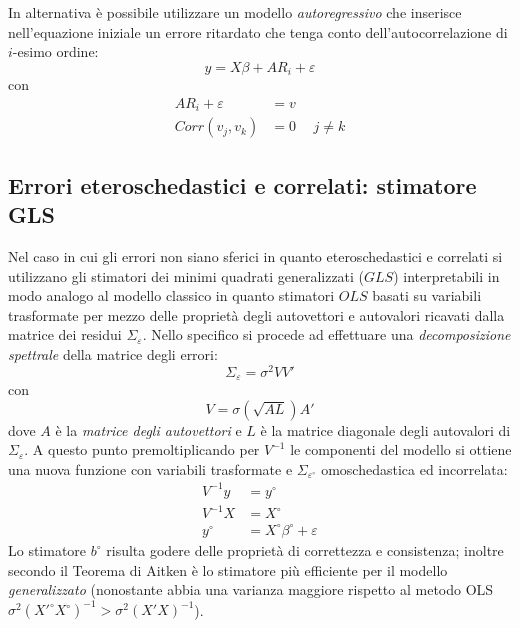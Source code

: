 \documentclass[a4page, 11pt]{article} %
\begin{document}
In alternativa è possibile utilizzare un modello \textit{autoregressivo} che inserisce nell’equazione iniziale un errore ritardato che tenga conto dell’autocorrelazione di $i$-esimo ordine:
\begin{equation*}
  y = X \beta + AR_i + \varepsilon
\end{equation*}
con 
\begin{align*}
  AR_i + \varepsilon &= v \\
  Corr(v_j,v_k) &= 0 \hspace{15pt} j \neq k
\end{align*}


\subsection*{Errori eteroschedastici e correlati: stimatore GLS}
Nel caso in cui gli errori non siano sferici in quanto eteroschedastici e correlati si utilizzano gli stimatori dei minimi quadrati generalizzati ($GLS$) interpretabili in modo analogo al modello classico in quanto stimatori $OLS$ basati su variabili trasformate per mezzo delle proprietà degli autovettori e autovalori ricavati dalla matrice dei residui $\Sigma_\varepsilon$.
Nello specifico si procede ad effettuare una \textit{decomposizione spettrale} della matrice degli errori:
\begin{equation*}
  \Sigma_\varepsilon = \sigma^2 VV'
\end{equation*}
con
\begin{equation*}
V = \sigma (\sqrt{AL})A'
\end{equation*}
dove $A$ è la \textit{matrice degli autovettori} e $L$ è la matrice diagonale degli autovalori di $\Sigma_\varepsilon$.
A questo punto premoltiplicando per $V^{-1}$ le componenti del modello si ottiene una nuova funzione con variabili trasformate e $\Sigma_{\varepsilon^\circ}$ omoschedastica ed incorrelata:
\begin{align*}
  V^{-1}y &= y^\circ \\
  V^{-1}X &= X^\circ \\
  y^\circ &= X^\circ \beta^\circ + \varepsilon
\end{align*}
Lo stimatore $b^\circ$ risulta godere delle proprietà di correttezza e consistenza; inoltre secondo il Teorema di Aitken è lo stimatore più efficiente per il modello \textit{generalizzato} (nonostante abbia una varianza maggiore rispetto al metodo OLS $\sigma^2 (X'^{\circ} X^{\circ})^{-1} > \sigma^2 (X'X)^{-1}$).
\end{document}
